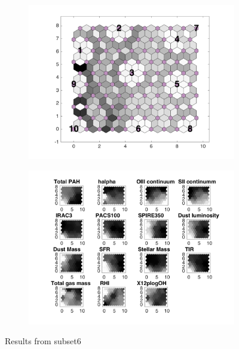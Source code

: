 \begin{figure}
    \begin{subfigure}[b]{0.5\textwidth}
        \centering
        \includegraphics[width=\textwidth]{../../images0.01/M31/2D/image_subsets/subset6_dist_with_hits_t.png}
        \label{fig: subset6_dist}
    \end{subfigure}
    \hfill
    \begin{subfigure}[b]{0.5\textwidth}
        \includegraphics[width=\textwidth]{../../images0.01/M31/2D/image_subsets/weight_planes_subset6.png}
        \label{fig: subset6_plane}
    \end{subfigure}
    \caption{Results from subset6}
    \label{fig: subset6}
\end{figure}